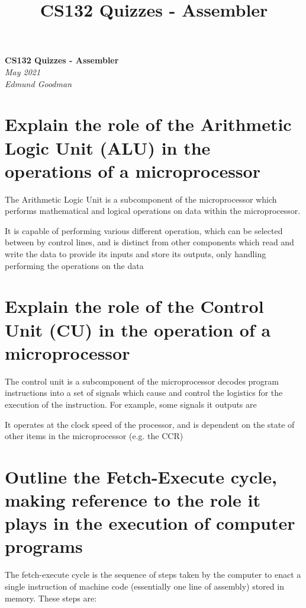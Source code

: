 \documentclass{article}
\title{CS132 Quizzes - Assembler}
\begin{document}
\begin{center}
    \Huge\textbf{CS132 Quizzes - Assembler}\\
    \huge\textit{May 2021}\\
    \medskip
    \Large\textit{Edmund Goodman}
\end{center}


\section{Explain the role of the Arithmetic Logic Unit (ALU) in the operations
of a microprocessor}

The Arithmetic Logic Unit is a subcomponent of the microprocessor which performs
mathematical and logical operations on data within the microprocessor.

It is capable of performing various different operation, which can be selected
between by control lines, and is distinct from other components which read and
write the data to provide its inputs and store its outputs, only handling
performing the operations on the data



\section{Explain the role of the Control Unit (CU) in the operation of a
microprocessor}

The control unit is a subcomponent of the microprocessor decodes program
instructions into a set of signals which cause and control the logistics for the
execution of the instruction. For example, some signals it outputs are

It operates at the clock speed of the processor, and is dependent on the state
of other items in the microprocessor (e.g. the CCR)



\section{Outline the Fetch-Execute cycle, making reference to the role it plays
in the execution of computer programs}

The fetch-execute cycle is the sequence of steps taken by the computer to enact
a single instruction of machine code (essentially one line of assembly) stored
in memory. These steps are:
\end{document}
